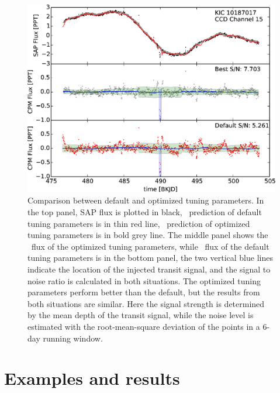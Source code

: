 \begin{figure}[p]
\begin{center}
\includegraphics[width=\textwidth]{figures/cpm/f3}
\end{center}
\caption[Comparison between default and optimized tuning parameters]{
  \label{hyperparameter}
  Comparison between default and optimized tuning parameters. 
  In the top panel, SAP flux is plotted in black, 
    \name\ prediction of default tuning parameters is in thin red line, 
    \name\ prediction of optimized tuning parameters is in bold grey line. 
  The middle panel shows the \name\ flux of the optimized tuning parameters, while \name\ flux of the default tuning parameters is in the bottom panel, the two vertical blue lines indicate the location of the injected transit signal, and the signal to noise ratio is calculated in both situations.
  The optimized tuning parameters perform better than the default, but the results from both situations are similar.
  Here the signal strength is determined by the mean depth of the transit signal, while the noise level is estimated with the root-mean-square deviation of the points in a 6-day running window.
}
\end{figure}

\section{Examples and results}

